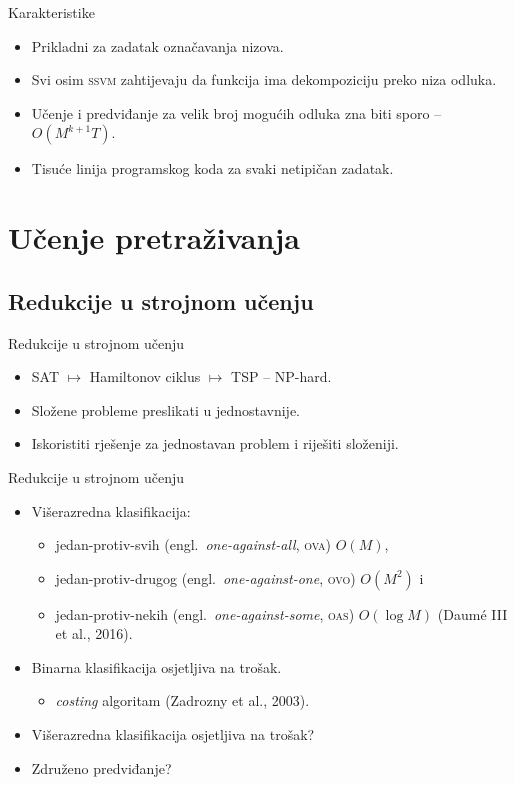 \documentclass{beamer}
\newcommand{\engla}[2]{(engl.~\emph{#1}, \textsc{#2})}
\begin{document}
\begin{frame}{Karakteristike}
  \begin{itemize}
    \item Prikladni za zadatak označavanja nizova.
    \item Svi osim \textsc{ssvm} zahtijevaju da funkcija ima dekompoziciju preko niza odluka.
    \item Učenje i predviđanje za velik broj mogućih odluka zna biti sporo --
    $O(M^{k+1} T)$.
    \item Tisuće linija programskog koda za svaki netipičan zadatak.
  \end{itemize}
\end{frame}

\section{Učenje pretraživanja}

\subsection{Redukcije u strojnom učenju}
\begin{frame}{Redukcije u strojnom učenju}
  \begin{itemize}
  \item SAT $\mapsto$ Hamiltonov ciklus $\mapsto$ TSP -- NP-hard.
  \item Složene probleme preslikati u jednostavnije.
  \item Iskoristiti rješenje za jednostavan problem i riješiti složeniji.
  \end{itemize}
\end{frame}

\begin{frame}{Redukcije u strojnom učenju}
  \begin{itemize}
  \item<1-> Višerazredna klasifikacija:
  \begin{itemize}
    \item<1-> jedan-protiv-svih   \engla{one-against-all}{ova} $O(M)$,
    \item<1-> jedan-protiv-drugog \engla{one-against-one}{ovo} $O(M^2)$ i
    \item<1-> jedan-protiv-nekih  \engla{one-against-some}{oas} $O(\log M)$
    (Daumé III et al., 2016).
  \end{itemize}
  \item<2-> Binarna klasifikacija osjetljiva na trošak.
  \begin{itemize}
    \item<2-> \textit{costing} algoritam (Zadrozny et al., 2003).
  \end{itemize}
  \item<3-> Višerazredna klasifikacija osjetljiva na trošak?
  \item<4-> Združeno predviđanje?
  \end{itemize}
\end{frame}
\end{document}
